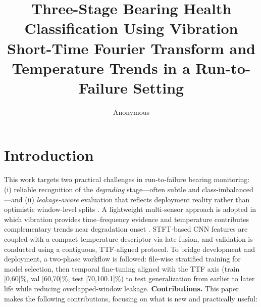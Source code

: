 \documentclass[pdflatex,sn-mathphys-num]{sn-jnl}%
\begin{document}
\title[Three-Stage Bearing Health Classification]{Three-Stage Bearing Health Classification Using Vibration Short-Time Fourier Transform and Temperature Trends in a Run-to-Failure Setting}

\author*{Anonymous}

\maketitle
\section{Introduction}
\label{sec:intro}

This work targets two practical challenges in run-to-failure bearing monitoring: (i) reliable recognition of the \emph{degrading} stage—often subtle and class-imbalanced—and (ii) \emph{leakage-aware} evaluation that reflects deployment reality rather than optimistic window-level splits \cite{jung2024dib_rtf,kaufman2012leakage,bergmeir2012timeseriescv}. A lightweight multi-sensor approach is adopted in which vibration provides time--frequency evidence and temperature contributes complementary trends near degradation onset \cite{baltrusaitis2019multimodal}. STFT-based CNN features are coupled with a compact temperature descriptor via late fusion, and validation is conducted using a contiguous, TTF-aligned protocol.
To bridge development and deployment, a two-phase workflow is followed: file-wise stratified training for model selection, then temporal fine-tuning aligned with the TTF axis (train [0,60]\%, val [60,70]\%, test [70,100.1]\%) to test generalization from earlier to later life while reducing overlapped-window leakage.
\textbf{Contributions.} This paper makes the following contributions, focusing on what is new and practically useful:
\end{document}
